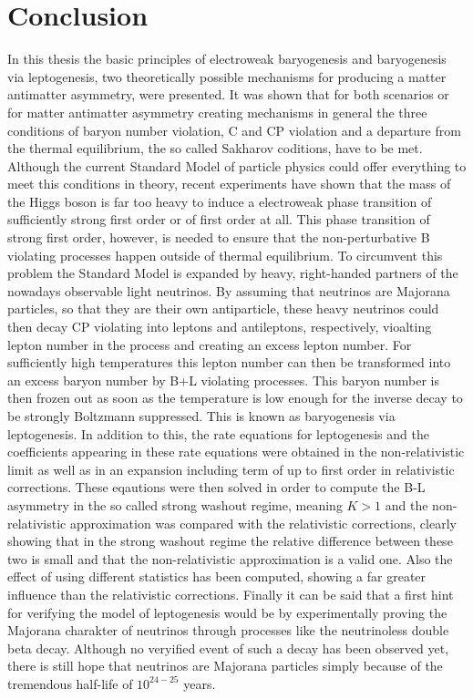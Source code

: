\chapter{Conclusion}
In this thesis the basic principles of electroweak baryogenesis and baryogenesis via leptogenesis, two theoretically possible mechanisms for producing a matter antimatter asymmetry, were presented. It was shown that for both scenarios or for matter antimatter asymmetry creating mechanisms in general the three conditions of baryon number violation, C and CP violation and a departure from the thermal equilibrium, the so called Sakharov coditions, have to be met. \newline \indent
Although the current Standard Model of particle physics could offer everything to meet this conditions in theory, recent experiments have shown that the mass of the Higgs boson is far too heavy to induce a electroweak phase transition of sufficiently strong first order or of first order at all. This phase transition of strong first order, however, is needed to ensure that the non-perturbative B violating processes happen outside of thermal equilibrium. \newline \indent
To circumvent this problem the Standard Model is expanded by heavy, right-handed partners of the nowadays observable light neutrinos. By assuming that neutrinos are Majorana particles, so that they are their own antiparticle, these heavy neutrinos could then decay CP violating into leptons and antileptons, respectively, vioalting lepton number in the process and creating an excess lepton number. For sufficiently high temperatures this lepton number can then be transformed into an excess baryon number by B+L violating processes. This baryon number is then frozen out as soon as the temperature is low enough for the inverse decay to be strongly Boltzmann suppressed. This is known as baryogenesis via leptogenesis. \newline \indent
In addition to this, the rate equations for leptogenesis and the coefficients appearing in these rate equations were obtained in the non-relativistic limit as well as in an expansion including term of up to first order in relativistic corrections. These eqautions were then solved in order to compute the B-L asymmetry in the so called strong washout regime, meaning $K>1$ and the non-relativistic approximation was compared with the relativistic corrections, clearly showing that in the strong washout regime the relative difference between these two is small and that the non-relativistic approximation is a valid one. Also the effect of using different statistics has been computed, showing a far greater influence than the relativistic corrections.  \newline \indent
Finally it can be said that a first hint for verifying the model of leptogenesis would be by experimentally proving the Majorana charakter of neutrinos through processes like the neutrinoless double beta decay. Although no veryified event of such a decay has been observed yet, there is still hope that neutrinos are Majorana particles simply because of the tremendous half-life of $10^{24-25}$ years\cite{Arnold:2016ezh}.
